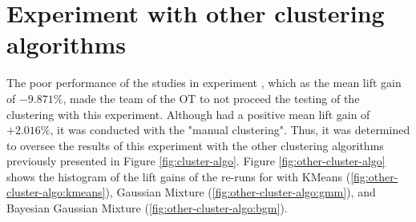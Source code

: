 \section{Experiment \nameExperimentII{} with other clustering algorithms}

The poor performance of the studies in experiment \nameExperimentI{}, which as the mean lift gain of $-9.871\%$, made the team of the OT to not proceed the testing of the clustering with this experiment. Although \nameExperimentII{} had a positive mean lift gain of $+2.016\%$, it was conducted with the "manual clustering". Thus, it was determined to oversee the results of this experiment with the other clustering algorithms previously presented in Figure \ref{fig:cluster-algo}. Figure \ref{fig:other-cluster-algo} shows the histogram of the lift gains of the re-runs for \nameExperimentII{} with KMeans (\ref{fig:other-cluster-algo:kmeans}), Gaussian Mixture (\ref{fig:other-cluster-algo:gmm}), and Bayesian Gaussian Mixture (\ref{fig:other-cluster-algo:bgm}).

